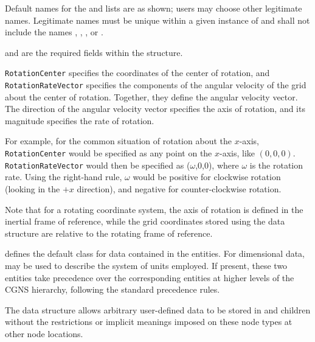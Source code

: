 \begin{notes}
\item Default names for the  and
       lists are as shown; users may choose
      other legitimate names.
      Legitimate names must be unique within a given instance
      of  and shall not include the names
      , , ,
      or .
\item {} and 
      are the required fields within the 
      structure.
\end{notes}

\texttt{RotationCenter} specifies the coordinates of the center of
rotation, and \texttt{RotationRateVector} specifies the components of
the angular velocity of the grid about the center of rotation.
Together, they define the angular velocity vector.
The direction of the angular velocity vector specifies the axis of
rotation, and its magnitude specifies the rate of rotation.

For example, for the common situation of rotation about the $x$-axis,
\texttt{RotationCenter} would be specified as any point on the $x$-axis,
like $(0,0,0)$.
\texttt{RotationRateVector} would then be specified as ($\omega$,0,0),
where $\omega$ is the rotation rate.
Using the right-hand rule, $\omega$ would be positive for clockwise
rotation (looking in the $+x$ direction), and negative for
counter-clockwise rotation.

Note that for a rotating coordinate system, the axis of rotation is
defined in the inertial frame of reference, while the grid coordinates
stored using the  data structure are
relative to the rotating frame of reference.

 defines the default class for data contained in the
 entities.
For dimensional data,  may be used to describe
the system of units employed.
If present, these two entities take precedence over the corresponding
entities at higher levels of the CGNS hierarchy, following the standard
precedence rules.

The  data structure allows arbitrary
user-defined data to be stored in  and
 children without the restrictions or implicit
meanings imposed on these node types at other node locations.

